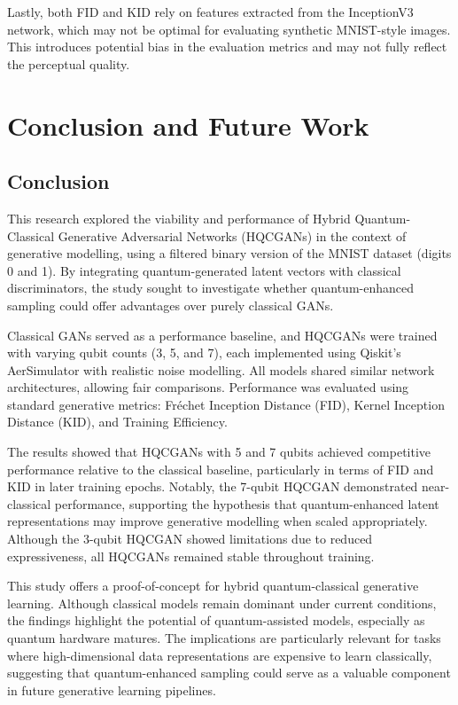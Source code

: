 \documentclass[conference]{IEEEtran}
\begin{document}
Lastly, both FID and KID rely on features extracted from the InceptionV3 network, which may not be optimal for evaluating synthetic MNIST-style images. This introduces potential bias in the evaluation metrics and may not fully reflect the perceptual quality.

\section{Conclusion and Future Work}

\subsection{Conclusion}

This research explored the viability and performance of Hybrid Quantum-Classical Generative Adversarial Networks (HQCGANs) in the context of generative modelling, using a filtered binary version of the MNIST dataset (digits 0 and 1). By integrating quantum-generated latent vectors with classical discriminators, the study sought to investigate whether quantum-enhanced sampling could offer advantages over purely classical GANs.

Classical GANs served as a performance baseline, and HQCGANs were trained with varying qubit counts (3, 5, and 7), each implemented using Qiskit’s AerSimulator with realistic noise modelling. All models shared similar network architectures, allowing fair comparisons. Performance was evaluated using standard generative metrics: Fréchet Inception Distance (FID), Kernel Inception Distance (KID), and Training Efficiency.

The results showed that HQCGANs with 5 and 7 qubits achieved competitive performance relative to the classical baseline, particularly in terms of FID and KID in later training epochs. Notably, the 7-qubit HQCGAN demonstrated near-classical performance, supporting the hypothesis that quantum-enhanced latent representations may improve generative modelling when scaled appropriately. Although the 3-qubit HQCGAN showed limitations due to reduced expressiveness, all HQCGANs remained stable throughout training.

This study offers a proof-of-concept for hybrid quantum-classical generative learning. Although classical models remain dominant under current conditions, the findings highlight the potential of quantum-assisted models, especially as quantum hardware matures. The implications are particularly relevant for tasks where high-dimensional data representations are expensive to learn classically, suggesting that quantum-enhanced sampling could serve as a valuable component in future generative learning pipelines.
\end{document}
